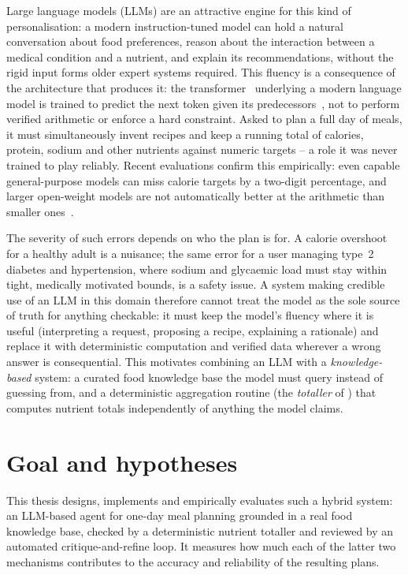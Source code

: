 Large language models (LLMs) are an attractive engine for this kind of personalisation: a modern instruction-tuned model can hold a natural conversation about food preferences, reason about the interaction between a medical condition and a nutrient, and explain its recommendations, without the rigid input forms older expert systems required. This fluency is a consequence of the architecture that produces it: the transformer~\cite{vaswani2017attention} underlying a modern language model is trained to predict the next token given its predecessors~\cite{brown2020language}, not to perform verified arithmetic or enforce a hard constraint. Asked to plan a full day of meals, it must simultaneously invent recipes and keep a running total of calories, protein, sodium and other nutrients against numeric targets -- a role it was never trained to play reliably. Recent evaluations confirm this empirically: even capable general-purpose models can miss calorie targets by a two-digit percentage, and larger open-weight models are not automatically better at the arithmetic than smaller ones~\cite{khamesian2025nutrigen}.

The severity of such errors depends on who the plan is for. A calorie overshoot for a healthy adult is a nuisance; the same error for a user managing type~2 diabetes and hypertension, where sodium and glycaemic load must stay within tight, medically motivated bounds, is a safety issue. A system making credible use of an LLM in this domain therefore cannot treat the model as the sole source of truth for anything checkable: it must keep the model's fluency where it is useful (interpreting a request, proposing a recipe, explaining a rationale) and replace it with deterministic computation and verified data wherever a wrong answer is consequential. This motivates combining an LLM with a \emph{knowledge-based} system: a curated food knowledge base the model must query instead of guessing from, and a deterministic aggregation routine (the \emph{totaller} of ) that computes nutrient totals independently of anything the model claims.

\section{Goal and hypotheses}
\label{sec:introduction-goal}

This thesis designs, implements and empirically evaluates such a hybrid system: an LLM-based agent for one-day meal planning grounded in a real food knowledge base, checked by a deterministic nutrient totaller and reviewed by an automated critique-and-refine loop. It measures how much each of the latter two mechanisms contributes to the accuracy and reliability of the resulting plans.

